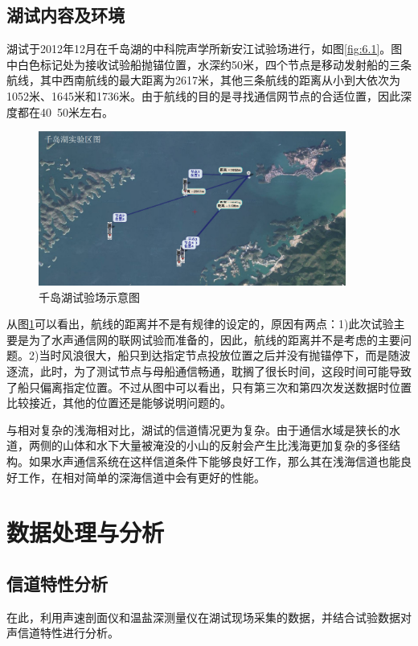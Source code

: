 \subsection{湖试内容及环境}
湖试于2012年12月在千岛湖的中科院声学所新安江试验场进行，如图\ref{fig:6.1}。图中白色标记处为接收试验船抛锚位置，水深约50米，四个节点是移动发射船的三条航线，其中西南航线的最大距离为2617米，其他三条航线的距离从小到大依次为1052米、1645米和1736米。由于航线的目的是寻找通信网节点的合适位置，因此深度都在40~50米左右。
\begin{figure}[htb]
  \begin{center}
    \includegraphics[width=0.9\textwidth]{images/exp.pdf}
  \end{center}
  \caption{千岛湖试验场示意图}
  \label{fig:6.4}
\end{figure}
从图\ref{fig:6.4}可以看出，航线的距离并不是有规律的设定的，原因有两点：1)此次试验主要是为了水声通信网的联网试验而准备的，因此，航线的距离并不是考虑的主要问题。2)当时风浪很大，船只到达指定节点投放位置之后并没有抛锚停下，而是随波逐流，此时，为了测试节点与母船通信畅通，耽搁了很长时间，这段时间可能导致了船只偏离指定位置。不过从图中可以看出，只有第三次和第四次发送数据时位置比较接近，其他的位置还是能够说明问题的。

与相对复杂的浅海相对比，湖试的信道情况更为复杂。由于通信水域是狭长的水道，两侧的山体和水下大量被淹没的小山的反射会产生比浅海更加复杂的多径结构。如果水声通信系统在这样信道条件下能够良好工作，那么其在浅海信道也能良好工作，在相对简单的深海信道中会有更好的性能。
\section{数据处理与分析}
\subsection{信道特性分析}
在此，利用声速剖面仪和温盐深测量仪在湖试现场采集的数据，并结合试验数据对声信道特性进行分析。
